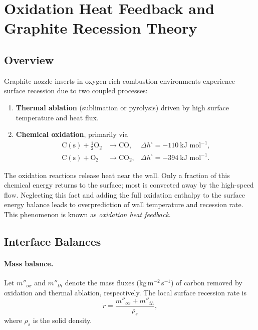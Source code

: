 \section{Oxidation Heat Feedback and Graphite Recession Theory}

\subsection{Overview}
Graphite nozzle inserts in oxygen-rich combustion environments experience surface recession due to two coupled processes:
\begin{enumerate}
  \item \textbf{Thermal ablation} (sublimation or pyrolysis) driven by high surface temperature and heat flux.
  \item \textbf{Chemical oxidation}, primarily via
  \begin{align*}
  \mathrm{C(s)} + \tfrac{1}{2}\mathrm{O_2} &\rightarrow \mathrm{CO}, &\Delta h^\circ = -110~\text{kJ mol}^{-1},\\
  \mathrm{C(s)} + \mathrm{O_2} &\rightarrow \mathrm{CO_2}, &\Delta h^\circ = -394~\text{kJ mol}^{-1}.
  \end{align*}
\end{enumerate}

The oxidation reactions release heat near the wall. Only a fraction of this chemical energy returns to the surface; most is convected away by the high-speed flow. Neglecting this fact and adding the full oxidation enthalpy to the surface energy balance leads to overprediction of wall temperature and recession rate. This phenomenon is known as \emph{oxidation heat feedback}.

\subsection{Interface Balances}

\paragraph{Mass balance.}
Let $m''_{ox}$ and $m''_{th}$ denote the mass fluxes (kg\,m$^{-2}$\,s$^{-1}$) of carbon removed by oxidation and thermal ablation, respectively. The local surface recession rate is
\begin{equation}
\dot{r} = \frac{m''_{ox} + m''_{th}}{\rho_s},
\end{equation}
where $\rho_s$ is the solid density.

